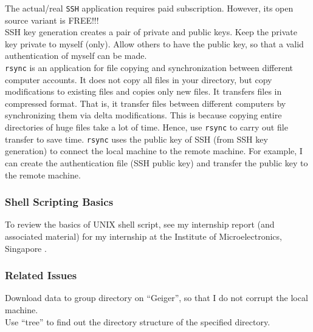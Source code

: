 The actual/real {\tt SSH} application requires paid subscription. However, its open source variant is FREE!!! \\

SSH key generation creates a pair of private and public keys. Keep the private key private to myself (only). Allow others to have the public key, so that a valid authentication of myself can be made. \\










{\tt rsync} is an application for file copying and synchronization between different computer accounts. It does not copy all files in your directory, but copy modifications to existing files and copies only new files. It transfers files in compressed format. That is, it transfer files between different computers by synchronizing them via delta modifications. This is because copying entire directories of huge files take a lot of time. Hence, use {\tt rsync} to carry out file transfer to save time. {\tt rsync} uses the public key of SSH (from SSH key generation) to connect the local machine to the remote machine. For example, I can create the authentication file (SSH public key) and transfer the public key to the remote machine. \\






\subsubsection{Shell Scripting Basics}
\label{sssec:ShellScriptingBasics}

To review the basics of UNIX shell script, see my internship report (and associated material) for my internship at the Institute of Microelectronics, Singapore \cite{Ong2004a}.

\subsubsection{Related Issues}
\label{sssec:ShellScriptingBasics:RelatedIssues}

Download data to group directory on ``Geiger'', so that I do not corrupt the local machine. \\

Use ``tree'' to find out the directory structure of the specified directory. \\

